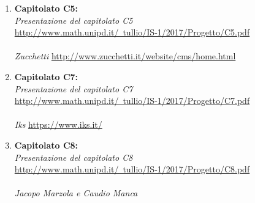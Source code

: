 \documentclass[StudioDiFattibilità.tex]{subfiles}
\begin{document}
\begin{enumerate}
	\item \textbf{Capitolato C5:}\\
		\textit{Presentazione del capitolato C5}\\
		\href{http://www.math.unipd.it/~tullio/IS-1/2017/Progetto/C5.pdf}{http://www.math.unipd.it/~tullio/IS-1/2017/Progetto/C5.pdf}\\\\
		\textit{Zucchetti} \href{http://www.zucchetti.it/website/cms/home.html}{http://www.zucchetti.it/website/cms/home.html}
		
	\item \textbf{Capitolato C7:}\\
		\textit{Presentazione del capitolato C7}\\
		\href{http://www.math.unipd.it/~tullio/IS-1/2017/Progetto/C7.pdf}{http://www.math.unipd.it/~tullio/IS-1/2017/Progetto/C7.pdf}\\\\
		\textit{Iks} \href{https://www.iks.it/}{https://www.iks.it/}
		
	\item \textbf{Capitolato C8:}\\
		\textit{Presentazione del capitolato C8}\\
		\href{http://www.math.unipd.it/~tullio/IS-1/2017/Progetto/C8.pdf}{http://www.math.unipd.it/~tullio/IS-1/2017/Progetto/C8.pdf}\\\\
		\textit{Jacopo Marzola e Caudio Manca}
		
		
\end{enumerate}
	
\end{document}
